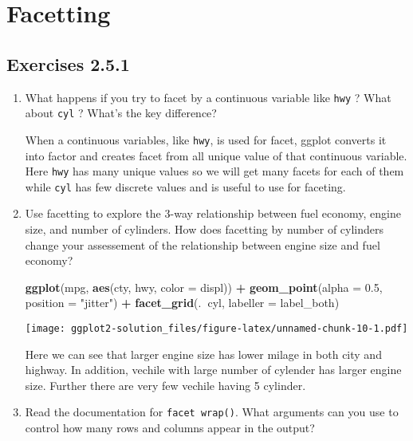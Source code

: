 \documentclass[]{book}
\newenvironment{Shaded}{\begin{snugshade}}{\end{snugshade}}
\newcommand{\KeywordTok}[1]{\textcolor[rgb]{0.13,0.29,0.53}{\textbf{#1}}}
\newcommand{\DataTypeTok}[1]{\textcolor[rgb]{0.13,0.29,0.53}{#1}}
\newcommand{\FloatTok}[1]{\textcolor[rgb]{0.00,0.00,0.81}{#1}}
\newcommand{\StringTok}[1]{\textcolor[rgb]{0.31,0.60,0.02}{#1}}
\newcommand{\OperatorTok}[1]{\textcolor[rgb]{0.81,0.36,0.00}{\textbf{#1}}}
\newcommand{\NormalTok}[1]{#1}
\begin{document}
\section{Facetting}\label{facetting}

\subsection{Exercises 2.5.1}\label{exercises-2.5.1}

\begin{enumerate}
\def\labelenumi{\arabic{enumi}.}
\item
  What happens if you try to facet by a continuous variable like
  \texttt{hwy} ? What about \texttt{cyl} ? What's the key difference?

  When a continuous variables, like \texttt{hwy}, is used for facet,
  ggplot converts it into factor and creates facet from all unique value
  of that continuous variable. Here \texttt{hwy} has many unique values
  so we will get many facets for each of them while \texttt{cyl} has few
  discrete values and is useful to use for faceting.
\item
  Use facetting to explore the 3-way relationship between fuel economy,
  engine size, and number of cylinders. How does facetting by number of
  cylinders change your assessement of the relationship between engine
  size and fuel economy?

\begin{Shaded}
\begin{Highlighting}[]
\KeywordTok{ggplot}\NormalTok{(mpg, }\KeywordTok{aes}\NormalTok{(cty, hwy, }\DataTypeTok{color =}\NormalTok{ displ)) }\OperatorTok{+}\StringTok{ }
\StringTok{  }\KeywordTok{geom_point}\NormalTok{(}\DataTypeTok{alpha =} \FloatTok{0.5}\NormalTok{, }\DataTypeTok{position =} \StringTok{"jitter"}\NormalTok{) }\OperatorTok{+}
\StringTok{  }\KeywordTok{facet_grid}\NormalTok{(.}\OperatorTok{~}\NormalTok{cyl, }\DataTypeTok{labeller =}\NormalTok{ label_both)}
\end{Highlighting}
\end{Shaded}

  \texttt{[image: ggplot2-solution\_files/figure-latex/unnamed-chunk-10-1.pdf]}

  Here we can see that larger engine size has lower milage in both city
  and highway. In addition, vechile with large number of cylender has
  larger engine size. Further there are very few vechile having 5
  cylinder.
\item
  Read the documentation for \texttt{facet\ wrap()}. What arguments can
  you use to control how many rows and columns appear in the output?


\end{enumerate}
\end{document}

